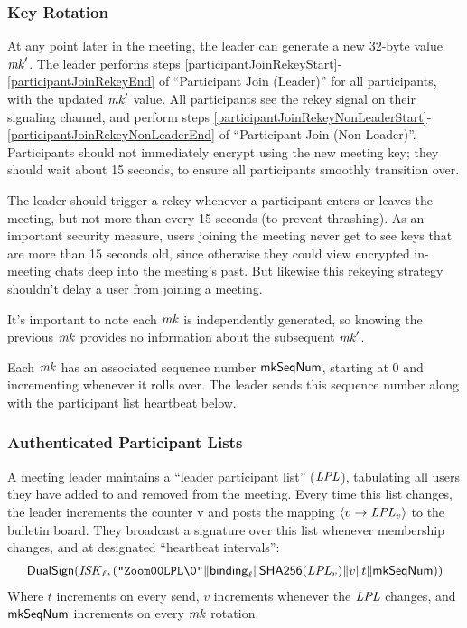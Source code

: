 \subsubsection{Key Rotation}

At any point later in the meeting, the leader can generate a new 32-byte value $\mathit{mk}'$. The leader performs steps \ref{participantJoinRekeyStart}-\ref{participantJoinRekeyEnd} of ``Participant Join (Leader)'' for all participants, with the updated $\mathit{mk}'$ value. All participants see the rekey signal on their signaling channel, and perform steps \ref{participantJoinRekeyNonLeaderStart}-\ref{participantJoinRekeyNonLeaderEnd} of ``Participant Join (Non-Loader)''.  Participants should not immediately encrypt using the new meeting key; they should wait about 15 seconds, to ensure all participants smoothly transition over.

The leader should trigger a rekey whenever a participant enters or leaves the meeting, but not more than every 15 seconds (to prevent thrashing). As an important security measure, users joining the meeting never get to see keys that are more than 15 seconds old, since otherwise they could view encrypted in-meeting chats deep into the meeting's past. But likewise this rekeying strategy shouldn't delay a user from joining a meeting.

It's important to note each $\mathit{mk}$ is independently generated, so knowing the previous $\mathit{mk}$ provides no information about the subsequent $\mathit{mk}'$.

Each $\mathit{mk}$ has an associated sequence number $\mathsf{mkSeqNum}$, starting at 0 and incrementing whenever it rolls over. The leader sends this sequence number along with the participant list heartbeat below.

\subsubsection{Authenticated Participant Lists}

A meeting leader maintains a ``leader participant list'' ($\mathit{LPL}$), tabulating
all users they have added to and removed from the meeting. Every time this list changes, the leader increments the counter v and posts the mapping $\langle v \rightarrow \mathit{LPL}_v \rangle$ to the bulletin board. They broadcast a signature over this list whenever membership changes, and at designated ``heartbeat intervals'':
%
\begin{multline*}
\mathsf{DualSign}(\mathit{ISK}_{\ell}, (\texttt{"Zoom00LPL\textbackslash0"} \| {\sf binding}_{\ell} \| \mathsf{SHA256}(\mathit{LPL}_v) \| v \| t \| \mathsf{mkSeqNum} ))
\end{multline*}
%
Where $t$ increments on every send, $v$ increments whenever the $\mathit{LPL}$ changes, and $\mathsf{mkSeqNum}$ increments on every $\mathit{mk}$ rotation.

